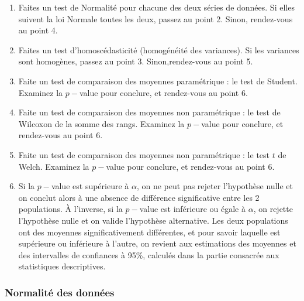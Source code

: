\documentclass[
  a4paper,
  DIV=11,
  numbers=noendperiod,
  oneside]{scrreprt}
\providecommand{\tightlist}{%
  \setlength{\itemsep}{0pt}\setlength{\parskip}{0pt}}\usepackage{longtable,booktabs,array}
\begin{document}
\begin{tcolorbox}[enhanced jigsaw, breakable, toprule=.15mm, colbacktitle=quarto-callout-warning-color!10!white, colframe=quarto-callout-warning-color-frame, arc=.35mm, bottomtitle=1mm, opacityback=0, title=\textcolor{quarto-callout-warning-color}{\faExclamationTriangle}\hspace{0.5em}{La procédure à suivre}, bottomrule=.15mm, colback=white, toptitle=1mm, rightrule=.15mm, leftrule=.75mm, opacitybacktitle=0.6, left=2mm, titlerule=0mm, coltitle=black]

\begin{enumerate}
\def\labelenumi{\arabic{enumi}.}
\tightlist
\item
  Faites un test de Normalité pour chacune des deux séries de données.
  Si elles suivent la loi Normale toutes les deux, passez au point 2.
  Sinon, rendez-vous au point 4.
\item
  Faites un test d'homoscédasticité (homogénéité des variances). Si les
  variances sont homogènes, passez au point 3. Sinon,rendez-vous au
  point 5.
\item
  Faite un test de comparaison des moyennes paramétrique : le test de
  Student. Examinez la \(p-\)value pour conclure, et rendez-vous au
  point 6.
\item
  Faite un test de comparaison des moyennes non paramétrique : le test
  de Wilcoxon de la somme des rangs. Examinez la \(p-\)value pour
  conclure, et rendez-vous au point 6.
\item
  Faite un test de comparaison des moyennes non paramétrique : le test
  \(t\) de Welch. Examinez la \(p-\)value pour conclure, et rendez-vous
  au point 6.
\item
  Si la \(p-\)value est supérieure à \(\alpha\), on ne peut pas rejeter
  l'hypothèse nulle et on conclut alors à une absence de différence
  significative entre les 2 populations. À l'inverse, si la \(p-\)value
  est inférieure ou égale à \(\alpha\), on rejette l'hypothèse nulle et
  on valide l'hypothèse alternative. Les deux populations ont des
  moyennes significativement différentes, et pour savoir laquelle est
  supérieure ou inférieure à l'autre, on revient aux estimations des
  moyennes et des intervalles de confiances à 95\%, calculés dans la
  partie consacrée aux statistiques descriptives.
\end{enumerate}

\end{tcolorbox}

\hypertarget{normalituxe9-des-donnuxe9es}{%
\subsubsection{Normalité des
données}\label{normalituxe9-des-donnuxe9es}}
\end{document}
